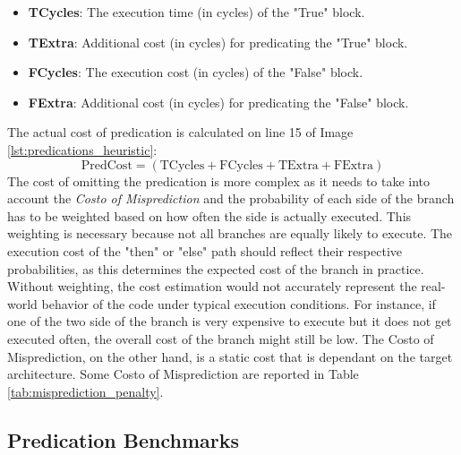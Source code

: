 \begin{itemize}
    \item \textbf{TCycles}: The execution time (in cycles) of the "True" block.
    \item \textbf{TExtra}: Additional cost (in cycles) for predicating the "True" block.
    \item \textbf{FCycles}: The execution cost (in cycles) of the "False" block.
    \item \textbf{FExtra}: Additional cost (in cycles) for predicating the "False" block.
\end{itemize}

The actual cost of predication is calculated on line 15 of Image \ref{lst:predications_heuristic}:
\[
\text{PredCost} = (\text{TCycles} + \text{FCycles} + \text{TExtra} + \text{FExtra})
\]
The cost of omitting the predication is more complex as it needs to take into account the \textit{Costo of Misprediction} and the probability of each side of the branch has to be weighted based on how often the side is actually executed.
This weighting is necessary because not all branches are equally likely to execute. The execution cost of the "then" or "else" path should reflect their respective probabilities, as this determines the expected cost of the branch in practice. Without weighting, the cost estimation would not accurately represent the real-world behavior of the code under typical execution conditions. For instance, if one of the two side of the branch is very expensive to execute but it does not get executed often, the overall cost of the branch might still be low.
The {Costo of Misprediction}, on the other hand, is a static cost that is dependant on the target architecture. Some {Costo of Misprediction} are reported in Table \ref{tab:misprediction_penalty}.

\subsection{Predication Benchmarks}
\label{sec:predication_benchmark}

\newpage